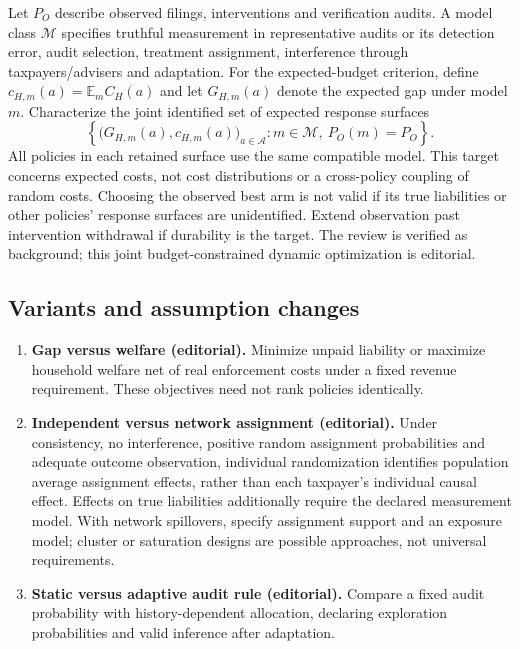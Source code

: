 \documentclass[11pt,a4paper]{article}
\begin{document}
Let \(P_O\) describe observed filings, interventions and verification audits. A model class \(\mathcal M\) specifies truthful measurement in representative audits or its detection error, audit selection, treatment assignment, interference through taxpayers/advisers and adaptation. For the expected-budget criterion, define \(c_{H,m}(a)=\mathbb E_m C_H(a)\) and let \(G_{H,m}(a)\) denote the expected gap under model \(m\). Characterize the joint identified set of expected response surfaces
\[
 \left\{\bigl(G_{H,m}(a),c_{H,m}(a)\bigr)_{a\in\mathcal A}:m\in\mathcal M,\ P_O(m)=P_O\right\}.
\]
All policies in each retained surface use the same compatible model. This target concerns expected costs, not cost distributions or a cross-policy coupling of random costs. Choosing the observed best arm is not valid if its true liabilities or other policies' response surfaces are unidentified. Extend observation past intervention withdrawal if durability is the target. The review is verified as background; this joint budget-constrained dynamic optimization is editorial.
\subsection*{Variants and assumption changes}
\begin{enumerate}
\item \textbf{Gap versus welfare (editorial).} Minimize unpaid liability or maximize household welfare net of real enforcement costs under a fixed revenue requirement. These objectives need not rank policies identically.
\item \textbf{Independent versus network assignment (editorial).} Under consistency, no interference, positive random assignment probabilities and adequate outcome observation, individual randomization identifies population average assignment effects, rather than each taxpayer's individual causal effect. Effects on true liabilities additionally require the declared measurement model. With network spillovers, specify assignment support and an exposure model; cluster or saturation designs are possible approaches, not universal requirements.
\item \textbf{Static versus adaptive audit rule (editorial).} Compare a fixed audit probability with history-dependent allocation, declaring exploration probabilities and valid inference after adaptation.
\end{enumerate}
\end{document}
